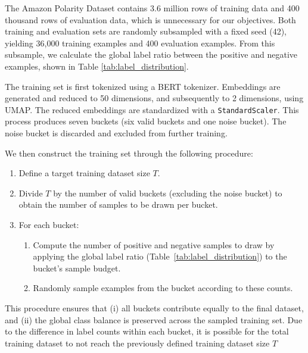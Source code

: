 \documentclass[twocolumn]{article}
\newcounter{ex}
\renewcommand{\indent}{\hspace*{2em}}
\begin{document}
\indent The Amazon Polarity Dataset contains 3.6 million rows of training data and 400 thousand rows of evaluation data, which is unnecessary for our objectives. Both training and evaluation sets are randomly subsampled with a fixed seed (42), yielding 36,000 training examples and 400 evaluation examples. From this subsample, we calculate the global label ratio between the positive and negative examples, shown in Table \ref{tab:label_distribution}.

\begin{table}[h!]
  \centering
  \caption{Distribution of sentiment labels in the subsampled Amazon Polarity dataset}
  \label{tab:label_distribution}
\end{table}

\indent The training set is first tokenized using a BERT tokenizer. Embeddings are generated and reduced to 50 dimensions, and subsequently to 2 dimensions, using UMAP. The reduced embeddings are standardized with a \texttt{StandardScaler}. This process produces seven buckets (six valid buckets and one noise bucket). The noise bucket is discarded and excluded from further training.

We then construct the training set through the following procedure:
\begin{enumerate}
    \item Define a target training dataset size $T$.
    \item Divide $T$ by the number of valid buckets (excluding the noise bucket) to obtain the number of samples to be drawn per bucket.
    \item For each bucket:
    \begin{enumerate}
        \item Compute the number of positive and negative samples to draw by applying the global label ratio (Table~\ref{tab:label_distribution}) to the bucket's sample budget.
        \item Randomly sample examples from the bucket according to these counts.
    \end{enumerate}
\end{enumerate}
This procedure ensures that (i) all buckets contribute equally to the final dataset, and (ii) the global class balance is preserved across the sampled training set. Due to the difference in label counts within each bucket, it is possible for the total training dataset to not reach the previously defined training dataset size $T$
\end{document}
